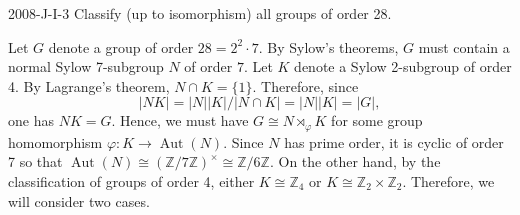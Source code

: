\documentclass{article}
\begin{document}
	\begin{prb}{2008-J-I-3}
		Classify (up to isomorphism) all groups of order 28. 
	\end{prb}
	Let $G$ denote a group of order $28 = 2^{2} \cdot 7$. By Sylow's theorems, $G$ must contain a normal Sylow 7-subgroup $N$ of order $7$. Let $K$ denote a Sylow 2-subgroup of order 4. By Lagrange's theorem, $N \cap K = \{1\}$. Therefore, since $$|NK| = |N||K|/|N \cap K| = |N||K| = |G|,$$ one has $NK = G$. Hence, we must have $G \cong N \rtimes_{\varphi} K$ for some group homomorphism $\varphi: K \to \operatorname{Aut}(N)$. Since $N$ has prime order, it is cyclic of order 7 so that $\operatorname{Aut}(N) \cong (\mathbb{Z}/7\mathbb{Z})^{\times} \cong \mathbb{Z}/6\mathbb{Z}$. On the other hand, by the classification of groups of order 4, either $K \cong \mathbb{Z}_{4}$ or $K \cong \mathbb{Z}_{2} \times \mathbb{Z}_{2}$. Therefore, we will consider two cases. 
	
\end{document}
